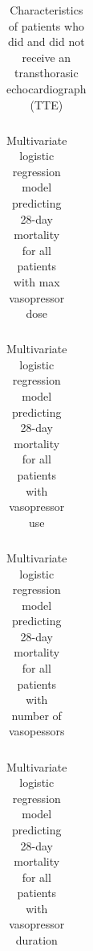 \documentclass[final,10pt]{elsarticle}
\begin{document}
\begin{table}[h]
\begin{tabular}{l c c c}
\toprule

\bottomrule
\end{tabular}
\caption{Characteristics of patients who did and did not receive an transthorasic echocardiograph (TTE)}
\label{tbl:hypers}
\end{table}

%

\begin{table}[h]
\begin{tabular}{l c c}
\toprule

\bottomrule
\end{tabular}
\caption{Multivariate logistic regression model predicting 28-day mortality for all patients with max vasopressor dose}
\label{tbl:all-comorb}
\end{table}

\begin{table}[h]
\begin{tabular}{l c c}
\toprule

\bottomrule
\end{tabular}
\caption{Multivariate logistic regression model predicting 28-day mortality for all patients with vasopressor use}
\label{tbl:all-comorb}
\end{table}

\begin{table}[h]
\begin{tabular}{l c c}
\toprule

\bottomrule
\end{tabular}
\caption{Multivariate logistic regression model predicting 28-day mortality for all patients with number of vasopessors}
\label{tbl:all-comorb}
\end{table}

\begin{table}[h]
\begin{tabular}{l c c}
\toprule

\bottomrule
\end{tabular}
\caption{Multivariate logistic regression model predicting 28-day mortality for all patients with vasopressor duration}
\label{tbl:all-comorb}
\end{table}
\end{document}
